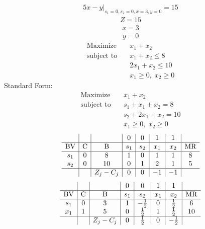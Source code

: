 \documentclass{article}
\begin{document}
\begin{align*}
\left.5x - y\right|_{s_{1}=0,s_{2}=0,x=3,y=0}=15\end{align*}
\begin{align*}
Z=15\end{align*}
\begin{align*}
x=3\end{align*}
\begin{align*}
y=0\end{align*}
\begin{align*}
\text{Maximize} \quad & x_{1} + x_{2}\\
\text{subject to} \quad
& x_{1} + x_{2}\le8\\
& 2x_{1} + x_{2}\le10\\
& x_{1}\ge0,\; x_{2}\ge0\end{align*}
Standard Form:\\
\begin{align*}
\text{Maximize} \quad & x_{1} + x_{2}\\
\text{subject to} \quad
& s_{1} + x_{1} + x_{2}=8\\
& s_{2} + 2x_{1} + x_{2}=10\\
& x_{1}\ge0,\; x_{2}\ge0\end{align*}
\begin{align*}
\begin{array}{c|c|c|c|c|c|c|c}
 &  &  & 0 & 0 & 1 & 1 & \\
\hline
\text{BV} & \text{C} & \text{B} & s_{1} & s_{2} & x_{1} & x_{2} & \text{MR} \\
\hline
s_{1} & 0 & 8 & 1 & 0 & 1 & 1 & 8 \\
s_{2} & 0 & 10 & 0 & 1 & 2 & 1 & 5 \\
\hline
 &  & Z_j-C_j & 0 & 0 & -1 & -1 & \\
\end{array}
\end{align*}
\begin{align*}
\begin{array}{c|c|c|c|c|c|c|c}
 &  &  & 0 & 0 & 1 & 1 & \\
\hline
\text{BV} & \text{C} & \text{B} & s_{1} & s_{2} & x_{1} & x_{2} & \text{MR} \\
\hline
s_{1} & 0 & 3 & 1 & -\frac{1}{2} & 0 & \frac{1}{2} & 6 \\
x_{1} & 1 & 5 & 0 & \frac{1}{2} & 1 & \frac{1}{2} & 10 \\
\hline
 &  & Z_j-C_j & 0 & \frac{1}{2} & 0 & -\frac{1}{2} & \\
\end{array}
\end{align*}
\end{document}
